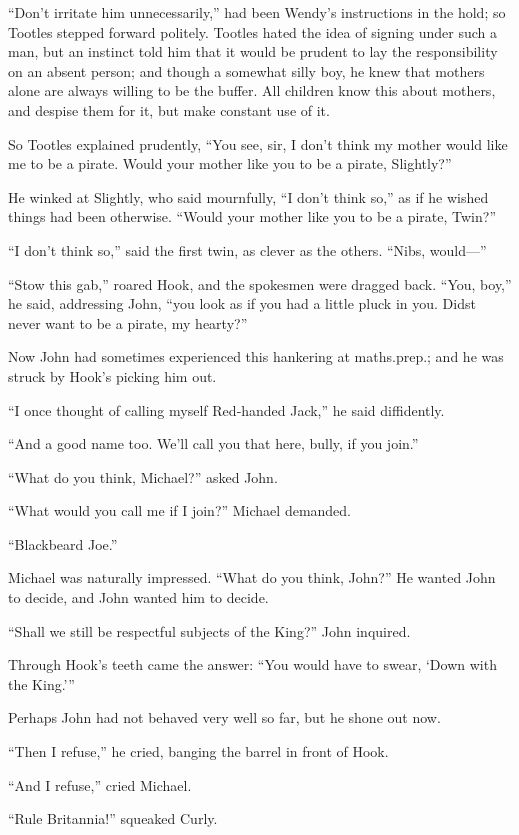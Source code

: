 “Don’t irritate him unnecessarily,” had been Wendy’s instructions in the hold;
so Tootles stepped forward politely.
Tootles hated the idea of signing under such a man,
but an instinct told him that it would be prudent to lay the responsibility on an absent person;
and though a somewhat silly boy,
he knew that mothers alone are always willing to be the buffer.
All children know this about mothers, and despise them for it,
but make constant use of it.

So Tootles explained prudently,
“You see, sir, I don’t think my mother would like me to be a pirate.
Would your mother like you to be a pirate, Slightly?”

He winked at Slightly, who said mournfully, “I don’t think so,”
as if he wished things had been otherwise.
“Would your mother like you to be a pirate, Twin?”

“I don’t think so,” said the first twin, as clever as the others.
“Nibs, would—”

“Stow this gab,” roared Hook, and the spokesmen were dragged back.
“You, boy,” he said, addressing John, “you look as if you had a little pluck in you.
Didst never want to be a pirate, my hearty?”

Now John had sometimes experienced this hankering at maths.\@ prep.\@;
and he was struck by Hook’s picking him out.

“I once thought of calling myself Red‐handed Jack,” he said diffidently.

“And a good name too.
We’ll call you that here, bully, if you join.”

“What do you think, Michael?\@” asked John.

“What would you call me if I join?\@” Michael demanded.

“Blackbeard Joe.”

Michael was naturally impressed.
“What do you think, John?”
He wanted John to decide, and John wanted him to decide.

“Shall we still be respectful subjects of the King?\@” John inquired.

Through Hook’s teeth came the answer:
“You would have to swear, ‘Down with the King.’”

Perhaps John had not behaved very well so far, but he shone out now.

“Then I refuse,” he cried, banging the barrel in front of Hook.

“And I refuse,” cried Michael.

“Rule Britannia!\@” squeaked Curly.

